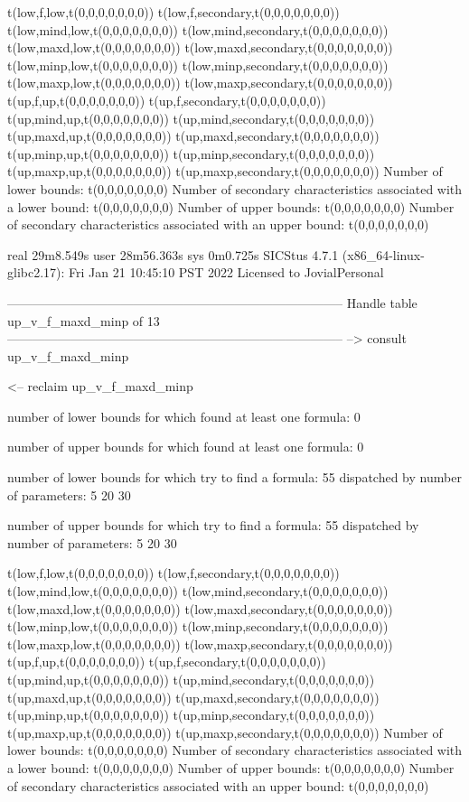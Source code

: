 t(low,f,low,t(0,0,0,0,0,0,0))
t(low,f,secondary,t(0,0,0,0,0,0,0))
t(low,mind,low,t(0,0,0,0,0,0,0))
t(low,mind,secondary,t(0,0,0,0,0,0,0))
t(low,maxd,low,t(0,0,0,0,0,0,0))
t(low,maxd,secondary,t(0,0,0,0,0,0,0))
t(low,minp,low,t(0,0,0,0,0,0,0))
t(low,minp,secondary,t(0,0,0,0,0,0,0))
t(low,maxp,low,t(0,0,0,0,0,0,0))
t(low,maxp,secondary,t(0,0,0,0,0,0,0))
t(up,f,up,t(0,0,0,0,0,0,0))
t(up,f,secondary,t(0,0,0,0,0,0,0))
t(up,mind,up,t(0,0,0,0,0,0,0))
t(up,mind,secondary,t(0,0,0,0,0,0,0))
t(up,maxd,up,t(0,0,0,0,0,0,0))
t(up,maxd,secondary,t(0,0,0,0,0,0,0))
t(up,minp,up,t(0,0,0,0,0,0,0))
t(up,minp,secondary,t(0,0,0,0,0,0,0))
t(up,maxp,up,t(0,0,0,0,0,0,0))
t(up,maxp,secondary,t(0,0,0,0,0,0,0))
Number of lower bounds:                                             t(0,0,0,0,0,0,0)
Number of secondary characteristics associated with a lower bound:  t(0,0,0,0,0,0,0)
Number of upper bounds:                                             t(0,0,0,0,0,0,0)
Number of secondary characteristics associated with an upper bound: t(0,0,0,0,0,0,0)

real	29m8.549s
user	28m56.363s
sys	0m0.725s
SICStus 4.7.1 (x86_64-linux-glibc2.17): Fri Jan 21 10:45:10 PST 2022
Licensed to JovialPersonal


--------------------------------------------------------------------------------
Handle table up_v_f_maxd_minp of 13
--------------------------------------------------------------------------------
--> consult up_v_f_maxd_minp

<-- reclaim up_v_f_maxd_minp

number of lower bounds for which found at least one formula: 0

number of upper bounds for which found at least one formula: 0

number of lower bounds for which try to find a formula: 55
dispatched by number of parameters: 5  20  30

number of upper bounds for which try to find a formula: 55
dispatched by number of parameters: 5  20  30

t(low,f,low,t(0,0,0,0,0,0,0))
t(low,f,secondary,t(0,0,0,0,0,0,0))
t(low,mind,low,t(0,0,0,0,0,0,0))
t(low,mind,secondary,t(0,0,0,0,0,0,0))
t(low,maxd,low,t(0,0,0,0,0,0,0))
t(low,maxd,secondary,t(0,0,0,0,0,0,0))
t(low,minp,low,t(0,0,0,0,0,0,0))
t(low,minp,secondary,t(0,0,0,0,0,0,0))
t(low,maxp,low,t(0,0,0,0,0,0,0))
t(low,maxp,secondary,t(0,0,0,0,0,0,0))
t(up,f,up,t(0,0,0,0,0,0,0))
t(up,f,secondary,t(0,0,0,0,0,0,0))
t(up,mind,up,t(0,0,0,0,0,0,0))
t(up,mind,secondary,t(0,0,0,0,0,0,0))
t(up,maxd,up,t(0,0,0,0,0,0,0))
t(up,maxd,secondary,t(0,0,0,0,0,0,0))
t(up,minp,up,t(0,0,0,0,0,0,0))
t(up,minp,secondary,t(0,0,0,0,0,0,0))
t(up,maxp,up,t(0,0,0,0,0,0,0))
t(up,maxp,secondary,t(0,0,0,0,0,0,0))
Number of lower bounds:                                             t(0,0,0,0,0,0,0)
Number of secondary characteristics associated with a lower bound:  t(0,0,0,0,0,0,0)
Number of upper bounds:                                             t(0,0,0,0,0,0,0)
Number of secondary characteristics associated with an upper bound: t(0,0,0,0,0,0,0)

